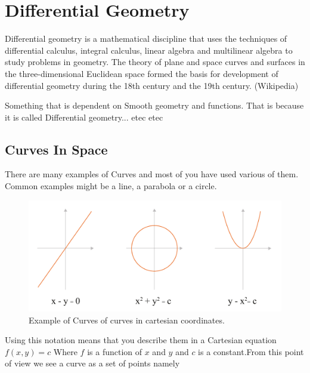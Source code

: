 \section{Differential Geometry}

Differential geometry is a mathematical discipline that uses the techniques of differential calculus, integral calculus, linear algebra and multilinear algebra to study problems in geometry. The theory of plane and space curves and surfaces in the three-dimensional Euclidean space formed the basis for development of differential geometry during the 18th century and the 19th century. (Wikipedia)

Something that is dependent on Smooth geometry and functions. That is because it is called Differential geometry... etec etec 


\newcommand{\upperRomannumeral}[1]{\uppercase\expandafter{\romannumeral#1}}
\newcommand{\lowerromannumeral}[1]{\romannumeral#1\relax}



\subsection{Curves In Space}
There are many examples of Curves and most of you have used various of them. Common examples might be a line, a parabola or a circle. 


\begin{figure}[H]
\centering
\includegraphics[width=0.9\linewidth ]{figure/Theory/CurveExample.pdf}  \caption{Example of Curves of curves in cartesian coordinates.\cite{ref:Presley} }
\end{figure}

Using this notation means that you describe them in a Cartesian equation $f(x,y) = c$
Where $f$ is a function of $x$ and $y$ and $c$ is a constant.From this point of view we see a curve as a set of points namely

